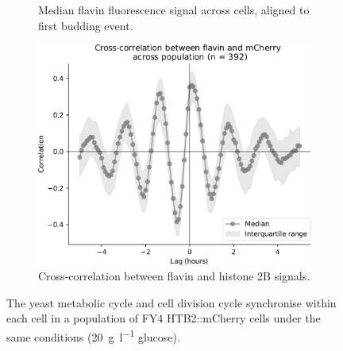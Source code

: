 \begin{figure}
\begin{subfigure}[htpb]{0.4\textwidth}
   \caption{
    Median flavin fluorescence signal across cells, aligned to first budding event.
   }
   \label{fig:biology-highglc-sync-median}
  \end{subfigure}

  \begin{subfigure}[htpb]{0.4\textwidth}
   \centering
   \includegraphics[width=\textwidth]{xcf_edit.pdf}
   \caption{
    Cross-correlation between flavin and histone 2B signals.
   }
   \label{fig:biology-highglc-sync-xcf}
  \end{subfigure}

  \caption{
    The yeast metabolic cycle and cell division cycle synchronise within each cell in a population of FY4 HTB2::mCherry cells under the same conditions (\SI{20}{\gram~\litre^{-1}} glucose).
  }
  \label{fig:biology-highglc-sync}
\end{figure}

